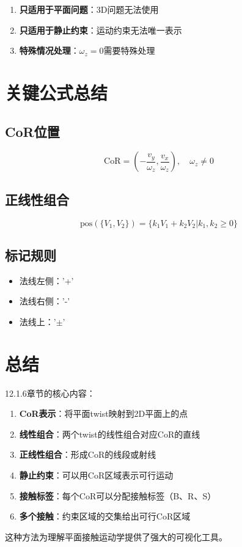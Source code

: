 \documentclass[12pt,a4paper]{article}
\begin{document}
\begin{enumerate}
\item \textbf{只适用于平面问题}：3D问题无法使用
\item \textbf{只适用于静止约束}：运动约束无法唯一表示
\item \textbf{特殊情况处理}：$\omega_z = 0$需要特殊处理
\end{enumerate}

\section{关键公式总结}

\subsection{CoR位置}

\begin{equation}
\text{CoR} = \left(-\frac{v_y}{\omega_z}, \frac{v_x}{\omega_z}\right), \quad \omega_z \neq 0
\end{equation}

\subsection{正线性组合}

\begin{equation}
\text{pos}(\{V_1, V_2\}) = \{k_1 V_1 + k_2 V_2 | k_1, k_2 \geq 0\}
\end{equation}

\subsection{标记规则}

\begin{itemize}
\item 法线左侧：'+'
\item 法线右侧：'-'
\item 法线上：'$\pm$'
\end{itemize}

\section{总结}

12.1.6章节的核心内容：

\begin{enumerate}
\item \textbf{CoR表示}：将平面twist映射到2D平面上的点

\item \textbf{线性组合}：两个twist的线性组合对应CoR的直线

\item \textbf{正线性组合}：形成CoR的线段或射线

\item \textbf{静止约束}：可以用CoR区域表示可行运动

\item \textbf{接触标签}：每个CoR可以分配接触标签（B、R、S）

\item \textbf{多个接触}：约束区域的交集给出可行CoR区域
\end{enumerate}

这种方法为理解平面接触运动学提供了强大的可视化工具。
\end{document}
